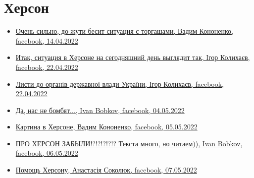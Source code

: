  
 
 
 
 

\section{Херсон}
\label{sec:topics.vojna.cities.herson}

\begin{itemize} %

\item \hyperlink{14_04_2022.fb.kononenko_vadim.herson.1.torgashi}{%
Очень сильно, до жути бесит ситуация с торгашами, Вадим Кононенко, facebook, 14.04.2022%
}

\item \hyperlink{22_04_2022.fb.kolyhaev_igor.herson.mer.1.herson}{%
Итак, ситуация в Херсоне на сегодняшний день выглядит так, Ігор Колихаєв, facebook, 22.04.2022%
}

\item \hyperlink{26_04_2022.fb.kolyhaev_igor.herson.mer.1.lysty}{%
Листи до органів державної влади України, Ігор Колихаєв, facebook, 22.04.2022%
}

\item \hyperlink{04_05_2022.fb.bobkov_ivan.1.nas_ne_bombjat}{%
Да, нас не бомбят..., Ivan Bobkov, facebook, 04.05.2022%
}

\item \hyperlink{05_05_2022.fb.kononenko_vadim.herson.1.kartina_v_hersone}{%
Картина в Херсоне, Вадим Кононенко, facebook, 05.05.2022%
}

\item \hyperlink{06_05_2022.fb.bobkov_ivan.1.pro_herson_zabyli}{%
ПРО ХЕРСОН ЗАБЫЛИ!?!?!?!?!?  Текста много, но читаем)), Ivan Bobkov, facebook, 06.05.2022%
}

\item \hyperlink{07_05_2022.fb.sokoljuk_anastasia.1.pomosch_hersonu}{%
Помощь Херсону, Анастасія Соколюк, facebook, 07.05.2022%
}

\end{itemize} %
